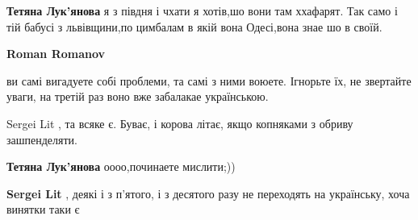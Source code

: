 \begin{itemize}
\begin{itemize}
 
\textbf{Тетяна Лук'янова} я з півдня і чхати я хотів,шо вони там ххафарят. Так само і тій бабусі з львівщини,по цимбалам в якій вона Одесі,вона знае шо в своїй.

 
\textbf{Roman Romanov} 

ви самі вигадуете собі проблеми, та самі з ними воюете. Ігнорьте їх, не
звертайте уваги, на третій раз воно вже забалакае українською.

 
Sergei Lit , та всяке є. Буває, і корова літає, якщо копняками з обриву зашпенделяти.

 
\textbf{Тетяна Лук'янова} оооо,починаете мислити;))

 
\textbf{Sergei Lit} , деякі і з п'ятого, і з десятого разу не переходять на українську, хоча винятки таки є

 

\end{itemize}
\end{itemize}

